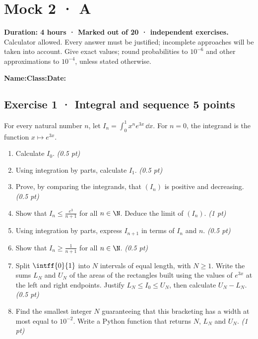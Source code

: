 \fi

\ifmxteacher

\mxnewpage{}\label{sujet:8-3}

\section*{Mock 2 · A}


\textbf{Duration: 4 hours · Marked out of 20 ·  independent exercises.}\\Calculator allowed. Every answer must be justified; incomplete approaches will be taken into account. Give exact values; round probabilities to $10^{-6}$ and other approximations to $10^{-4}$, unless stated otherwise.

\smallskip\textbf{Name:}\enspace\dotfill\quad\textbf{Class:}\enspace\dotfill\quad\textbf{Date:}\enspace\dotfill

\subsection*{Exercise 1 · Integral and sequence \hfill 5 points}For every natural number $n$, let $I_n=\displaystyle\int_0^1x^ne^{3x}\,\dd x$. For $n=0$, the integrand is the function $x\mapsto e^{3x}$.

\begin{enumerate}

\item Calculate $I_0$. \hfill\textit{(0.5 pt)}

\item Using integration by parts, calculate $I_1$. \hfill\textit{(0.5 pt)}

\item Prove, by comparing the integrands, that $(I_n)$ is positive and decreasing. \hfill\textit{(0.5 pt)}

\item Show that $I_n\le\frac{e^{3}}{n+1}$ for all $n\in\N$. Deduce the limit of $(I_n)$. \hfill\textit{(1 pt)}

\item Using integration by parts, express $I_{n+1}$ in terms of $I_n$ and $n$. \hfill\textit{(0.5 pt)}

\item Show that $I_n\ge\frac1{n+1}$ for all $n\in\N$. \hfill\textit{(0.5 pt)}

\item Split $\intff{0}{1}$ into $N$ intervals of equal length, with $N\ge1$. Write the sums $L_N$ and $U_N$ of the areas of the rectangles built using the values of $e^{3x}$ at the left and right endpoints. Justify $L_N\le I_0\le U_N$, then calculate $U_N-L_N$. \hfill\textit{(0.5 pt)}

\item Find the smallest integer $N$ guaranteeing that this bracketing has a width at most equal to $10^{-2}$. Write a Python function that returns $N$, $L_N$ and $U_N$. \hfill\textit{(1 pt)}

\end{enumerate}


